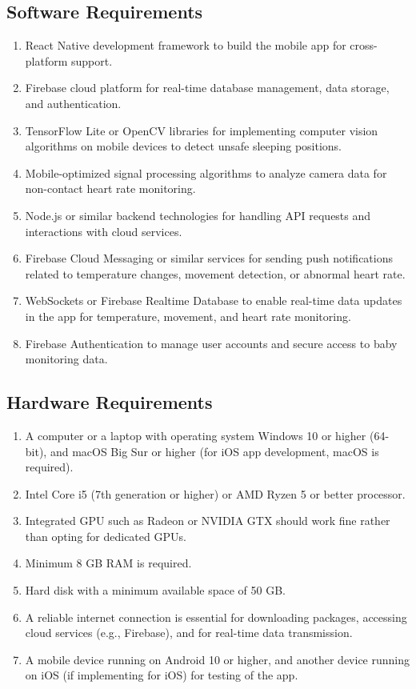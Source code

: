 \documentclass[12pt,a4paper]{report}
\begin{document}
\subsection*{Software Requirements}
\begin{enumerate}
    \item React Native development framework to build the mobile app for cross-platform support\cite{2}.
    \item Firebase cloud platform for real-time database management, data storage, and authentication\cite{3}.
    \item TensorFlow Lite or OpenCV libraries for implementing computer vision algorithms on mobile devices to detect unsafe sleeping positions\cite{4}\cite{5}\cite{6}.
    \item Mobile-optimized signal processing algorithms to analyze camera data for non-contact heart rate monitoring\cite{7}\cite{8}\cite{9}.
    \item Node.js or similar backend technologies for handling API requests and interactions with cloud services.
    \item Firebase Cloud Messaging or similar services for sending push notifications related to temperature changes, movement detection, or abnormal heart rate.
    \item WebSockets or Firebase Realtime Database to enable real-time data updates in the app for temperature, movement, and heart rate monitoring.
    \item Firebase Authentication to manage user accounts and secure access to baby monitoring data.
\end{enumerate}
\subsection*{Hardware Requirements}
\begin{enumerate}
    \item A computer or a laptop with operating system Windows 10 or higher (64-bit), and macOS Big Sur or higher (for iOS app development, macOS is required).
    \item Intel Core i5 (7th generation or higher) or AMD Ryzen 5 or better processor.
    \item Integrated GPU such as Radeon or NVIDIA GTX should work fine rather than opting for dedicated GPUs.
    \item Minimum 8 GB RAM is required.
    \item Hard disk with a minimum available space of 50 GB.
    \item A reliable internet connection is essential for downloading packages, accessing cloud services (e.g., Firebase), and for real-time data transmission.
    \item A mobile device running on Android 10 or higher, and another device running on iOS (if implementing for iOS) for testing of the app.
\end{enumerate}
\newpage
\pagestyle{plain}
\renewcommand{\bibname}{References}
\end{document}
